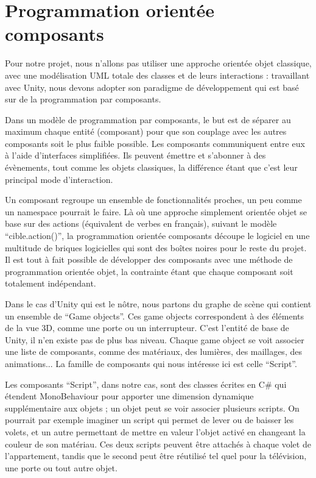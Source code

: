 \section{Programmation orientée composants}

Pour notre projet, nous n'allons pas utiliser une approche orientée objet classique, avec une modélisation UML totale des classes et de leurs interactions : travaillant avec Unity, nous devons adopter son paradigme de développement qui est basé sur de la programmation par composants.\newline

Dans un modèle de programmation par composants, le but est de séparer au maximum chaque entité (composant) pour que son couplage avec les autres composants soit le plus faible possible. Les composants communiquent entre eux à l'aide d'interfaces simplifiées. Ils peuvent émettre et s'abonner à des évènements, tout comme les objets classiques, la différence étant que c'est leur principal mode d'interaction.\newline

Un composant regroupe un ensemble de fonctionnalités proches, un peu comme un namespace pourrait le faire. Là où une approche simplement orientée objet se base sur des actions (équivalent de verbes en français), suivant le modèle \enquote{cible.action()}, la programmation orientée composants découpe le logiciel en une multitude de briques logicielles qui sont des boîtes noires pour le reste du projet. Il est tout à fait possible de développer des composants avec une méthode de programmation orientée objet, la contrainte étant que chaque composant soit totalement indépendant.\newline

Dans le cas d'Unity qui est le nôtre, nous partons du graphe de scène qui contient un ensemble de \enquote{Game objects}. Ces game objects correspondent à des éléments de la vue 3D, comme une porte ou un interrupteur. C'est l'entité de base de Unity, il n'en existe pas de plus bas niveau. Chaque game object se voit associer une liste de composants, comme des matériaux, des lumières, des maillages, des animations... La famille de composants qui nous intéresse ici est celle \enquote{Script}.\newline

Les composants \enquote{Script}, dans notre cas, sont des classes écrites en C\# qui étendent MonoBehaviour pour apporter une dimension dynamique supplémentaire aux objets ; un objet peut se voir associer plusieurs scripts. On pourrait par exemple imaginer un script qui permet de lever ou de baisser les volets, et un autre permettant de mettre en valeur l'objet activé en changeant la couleur de son matériau. Ces deux scripts peuvent être attachés à chaque volet de l'appartement, tandis que le second peut être réutilisé tel quel pour la télévision, une porte ou tout autre objet.\newline

